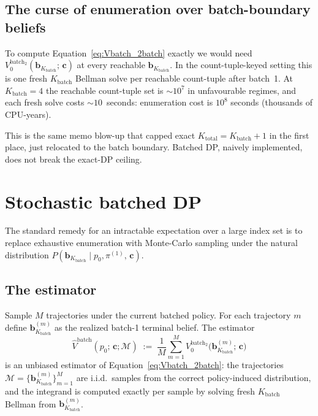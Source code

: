 \documentclass[11pt,a4paper]{article}
\newcommand{\bc}{\bm{c}}
\newcommand{\bb}{\bm{b}}
\begin{document}
\subsection{The curse of enumeration over batch-boundary beliefs}

To compute Equation~\eqref{eq:Vbatch_2batch} exactly we would need
$V_0^{\mathrm{batch}_2}(\bb_{K_\mathrm{batch}};\, \bc)$ at every reachable
$\bb_{K_\mathrm{batch}}$.  In the count-tuple-keyed setting this is one fresh
$K_\mathrm{batch}$ Bellman solve per reachable count-tuple after batch~1.  At
$K_\mathrm{batch} = 4$ the reachable count-tuple set is $\sim 10^7$ in unfavourable
regimes, and each fresh solve costs $\sim 10$~seconds: enumeration cost is $10^8$ seconds
(thousands of CPU-years).

This is the same memo blow-up that capped exact $K_\mathrm{total} = K_\mathrm{batch} + 1$
in the first place, just relocated to the batch boundary.  Batched DP, naively
implemented, does not break the exact-DP ceiling.

\section{Stochastic batched DP}
\label{sec:stochastic}

The standard remedy for an intractable expectation over a large index set is to replace
exhaustive enumeration with Monte-Carlo sampling under the natural distribution
$P(\bb_{K_\mathrm{batch}} \mid p_0, \pi^{(1)},\, \bc)$.

\subsection{The estimator}

Sample $M$ trajectories under the current batched policy.  For each trajectory $m$ define
$\bb_{K_\mathrm{batch}}^{(m)}$ as the realized batch-1 terminal belief.  The estimator
\begin{equation}
\widehat{V}^\mathrm{batch}(p_0;\, \bc; \mathcal{M})
\;:=\;
\frac{1}{M} \sum_{m=1}^{M}
V_0^{\mathrm{batch}_2}\bigl(\bb_{K_\mathrm{batch}}^{(m)};\, \bc\bigr)
\label{eq:estimator}
\end{equation}
is an unbiased estimator of Equation~\eqref{eq:Vbatch_2batch}: the trajectories
$\mathcal{M} = \{\bb_{K_\mathrm{batch}}^{(m)}\}_{m=1}^M$ are i.i.d.\ samples from the
correct policy-induced distribution, and the integrand is computed exactly per sample by
solving fresh $K_\mathrm{batch}$ Bellman from $\bb_{K_\mathrm{batch}}^{(m)}$.
\end{document}

